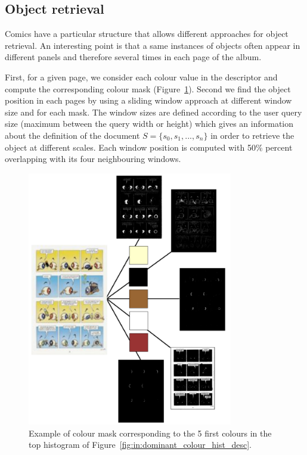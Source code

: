 \subsection{Object retrieval}
Comics have a particular structure that allows different approaches for object retrieval. An interesting point is that a same instances of objects often appear in different panels and therefore several times in each page of the album.

First, for a given page, we consider each colour value in the descriptor and compute the corresponding colour mask (Figure~\ref{fig:in:masks}). %
Second we find the object position in each pages by using a sliding window approach at different window size and for each mask.
The window sizes are defined according to the user query size (maximum between the query width or height) which gives an information about the definition of the document $S=\{s_0,s_1,...,s_n\}$ in order to retrieve the object at different scales.
Each window position is computed with 50\% percent overlapping with its four neighbouring windows.

 \begin{figure}[!ht]  %
   \centering
  \includegraphics[width=0.8\textwidth]{masks.png}
  \caption[Colour mask corresponding to five colour of the query descriptor]{Example of colour mask corresponding to the 5 first colours in the top histogram of Figure~\ref{fig:in:dominant_colour_hist_desc}.}
  \label{fig:in:masks}
 \end{figure}


